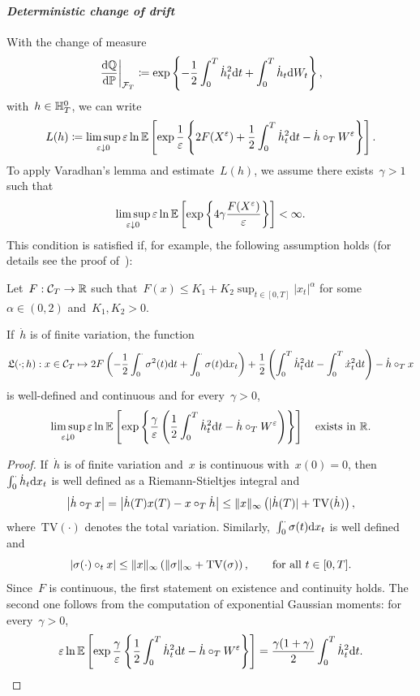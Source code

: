 \paragraph{\textit{Deterministic change of drift}}
With the change of measure
$$
\left. \frac{\mathrm{d}\mathbb{Q}}{\mathrm{d}\mathbb{P}}\right|_{\mathcal{F}_T}
 \coloneqq \exp\left\{-\frac{1}{2}\int_0^T\dot{h}_t^2 \mathrm{d} t  + \int_0^T\dot{h}_t\mathrm{d} W_t \right\},
$$
with~$h\in\mathbb{H}_T^0$, we can write
$$
L(h)\coloneqq\limsup\limits_{\varepsilon\downarrow 0} \varepsilon \ln\mathbb{E}\left[\exp\frac{1}{\varepsilon}\left\{{2F(X^{\varepsilon}) +\frac{1}{2}\int_0^T\dot{h}_t^2 \mathrm{d} t  - \dot{h}\circ_{T} W^{\varepsilon}}\right\}\right].
$$
To apply Varadhan's lemma and estimate~$L(h)$, we assume there exists~$\gamma >1$ such that 
\begin{equation}\label{eq:BSAssume}
\limsup\limits_{\varepsilon\downarrow 0} \varepsilon\ln\mathbb{E}\left[
\exp\left\{4\gamma \frac{F(X^{\varepsilon})}{\varepsilon}\right\}\right] <\infty.
\end{equation}
This condition is satisfied if, for example, the following assumption holds (for details see the proof of~\cite[Theorem~3.6]{Guasoni2007OptimalTime}):
\begin{assumption}\label{ass:payoffGuassoni}
Let~$F:\mathcal{C}_T\rightarrow\mathbb{R}$ such that~$F(x)\leq K_{1} + K_{2} \sup_{t\in[0,T]}|x_t|^{\alpha}$ 
for some~$\alpha\in (0,2)$ and~$K_{1}, K_{2}>0$.
\end{assumption}
\begin{lemma}\label{lem:BSVaradhanCond}
If~$\dot{h}$ is of finite variation, the function
\[
\mathfrak{L}(\cdot;h):
x\in \mathcal{C}_T \mapsto 2F\left(-\frac{1}{2}\int_0^\cdot \sigma^2(t)\mathrm{d} t + \int_0^\cdot \sigma(t) \mathrm{d} x_t\right)
 + \frac{1}{2}\left(\int_0^T \dot{h}_t^2\mathrm{d} t-\int_0^T \dot{x}_t^2 \mathrm{d} t\right)
 - \dot{h}\circ_{T} x
\]
is well-defined and continuous and for every~$\gamma >0$, 
$$
\limsup\limits_{\varepsilon\downarrow 0} \varepsilon \ln\mathbb{E}\left[\exp\left\{\frac{\gamma}{\varepsilon}\left(\frac{1}{2}\int_0^T \dot{h}_t^2\mathrm{d} t
- \dot{h}\circ_{T} W^{\varepsilon}\right)\right\}\right]
\quad
\text{exists in~$\mathbb{R}$.}
$$
\end{lemma}
\begin{proof}
If~$\dot{h}$ is of finite variation and~$x$ is continuous with~$x(0)=0$, 
then~$\int_0^\cdot\dot{h}_t\mathrm{d} x_t$ is well defined as a Riemann-Stieltjes integral and 
$$
\left|\dot{h}\circ_{T} x\right| = \left|\dot{h}(T)x(T) - x\circ_{T} \dot{h}\right| \leq \|x\|_\infty\left(|\dot{h}(T)| + \mathrm{TV}(\dot{h})\right ),
$$
where~$\mathrm{TV}(\cdot)$ denotes the total variation. 
Similarly,~$\int_0^\cdot\sigma(t)\mathrm{d} x_t$ is well defined and
$$
\left|\sigma(\cdot)\circ_{t} x\right| \leq \|x\|_\infty\left(\|\sigma\|_\infty + \mathrm{TV}(\sigma)\right),
\qquad\text{for all }t \in [0,T].
$$
Since~$F$ is continuous, the first statement on existence and continuity holds.
The second one follows from the computation of exponential Gaussian moments: 
for every~$\gamma >0$, 
$$
\varepsilon  \ln\mathbb{E}\left[\exp\frac{\gamma}{\varepsilon}\left\{\frac{1}{2}\int_0^T \dot{h}_t^2\mathrm{d} t
- \dot{h}\circ_{T} W^{\varepsilon}\right\}\right]
= \frac{\gamma(1+\gamma)}{2}\int_0^T\dot{h}_t^2\mathrm{d} t.
$$
\end{proof}
